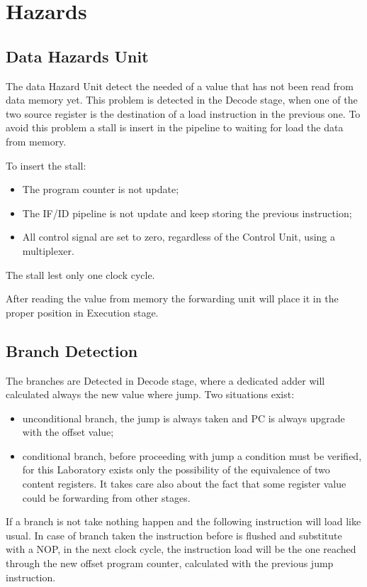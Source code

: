 %
\chapter{Hazards}
\label{cha4}

\section{Data Hazards Unit}

The data Hazard Unit detect the needed of a value that has not been read from 
data memory yet. This problem is detected in the Decode stage, when one of the 
two source register is the destination of a load instruction in the previous one. 
To avoid this problem a stall is insert in the pipeline to waiting for load the data 
from memory. 

To insert the stall:
\begin{itemize}
    \item The program counter is not update;
    \item The IF/ID pipeline is not update and keep storing the previous instruction;
    \item All control signal are set to zero, regardless of the Control Unit, using a multiplexer.
\end{itemize}
The stall lest only one clock cycle.

After reading the value from memory the forwarding unit will place it in the proper 
position in Execution stage.

\section{Branch Detection}

The branches are Detected in Decode stage, where a dedicated adder will calculated always the new value where jump.
Two situations exist:
\begin{itemize}
    \item unconditional branch, the jump is always taken and PC is always upgrade with the offset value;
    \item conditional branch, before proceeding with jump a condition must be verified, for this Laboratory
     exists only the possibility of the equivalence of two content registers. It takes care also about the fact that
     some register value could be forwarding from other stages. 
\end{itemize}

If a branch is not take nothing happen and the following instruction will load like usual. 
In case of branch taken the instruction before is flushed and substitute with a NOP, 
in the next clock cycle, the instruction load will be the 
one reached through the new offset program counter, calculated with the previous jump instruction.

